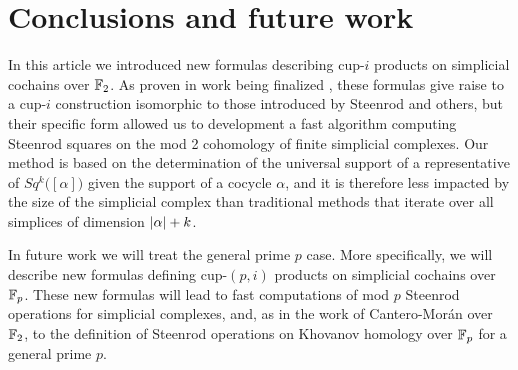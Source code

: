 
\section{Conclusions and future work} \label{s:conclusion}

In this article we introduced new formulas describing cup-$i$ products on simplicial cochains over ${\mathbb{F}_2}$.
As proven in work being finalized \cite{medina2018axiomatic}, these formulas give raise to a cup-$i$ construction isomorphic to those introduced by Steenrod and others, but their specific form allowed us to development a fast algorithm computing Steenrod squares on the mod 2 cohomology of finite simplicial complexes.
Our method is based on the determination of the universal support of a representative of $Sq^k\big( [\alpha] \big)$ given the support of a cocycle $\alpha$, and it is therefore less impacted by the size of the simplicial complex than traditional methods that iterate over all simplices of dimension $\lvert\alpha\rvert + k$.

In future work we will treat the general prime $p$ case.
More specifically, we will describe new formulas defining cup-$(p,i)$ products on simplicial cochains over ${\mathbb{F}_p}$.
These new formulas will lead to fast computations of mod $p$ Steenrod operations for simplicial complexes, and, as in the work of Cantero-Mor\'an \cite{cantero-moran2020khovanov} over ${\mathbb{F}_2}$, to the definition of Steenrod operations on Khovanov homology over ${\mathbb{F}_p}$ for a general prime $p$.
